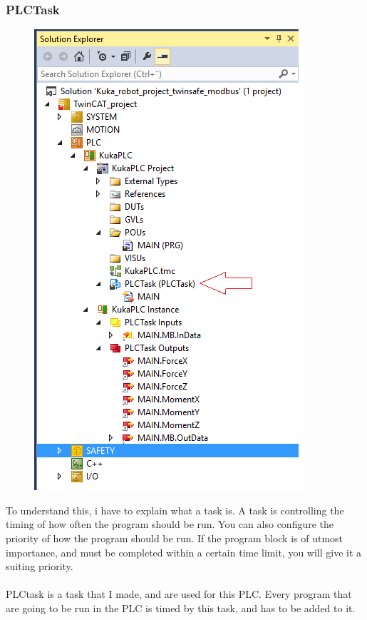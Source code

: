 \documentclass{article}
\begin{document}
\subsubsection{PLCTask}
\begin{figure}[!h]
    \centering
    \includegraphics[scale=0.7]{pictures/TC3_overview/TC3_PLCTask.png}
    \caption{}
  
\end{figure}

To understand this, i have to explain what a task is. A task is controlling the timing of how often the program should be run. You can also configure the priority of how the program should be run. If the program block is of utmost importance, and must be completed within a certain time limit, you will give it a suiting priority. 
\\
\\
PLCtask is a task that I made, and are used for this PLC. Every program that are going to be run in the PLC is timed by this task, and has to be added to it. 
\end{document}
